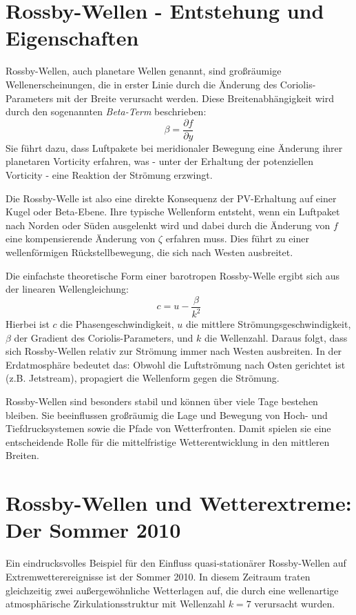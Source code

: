 \begin{refsection}
\section{Rossby-Wellen - Entstehung und Eigenschaften}

Rossby-Wellen, auch planetare Wellen genannt, sind großräumige Wellenerscheinungen, die in erster Linie durch die Änderung des Coriolis-Parameters mit der Breite verursacht werden.  
Diese Breitenabhängigkeit wird durch den sogenannten \emph{Beta-Term} beschrieben:
\[
\beta = \frac{\partial f}{\partial y}
\]
Sie führt dazu, dass Luftpakete bei meridionaler Bewegung eine Änderung ihrer planetaren Vorticity erfahren, was - unter der Erhaltung der potenziellen Vorticity - eine Reaktion der Strömung erzwingt.  

Die Rossby-Welle ist also eine direkte Konsequenz der PV-Erhaltung auf einer Kugel oder Beta-Ebene.  
Ihre typische Wellenform entsteht, wenn ein Luftpaket nach Norden oder Süden ausgelenkt wird und dabei durch die Änderung von \( f \) eine kompensierende Änderung von \( \zeta \) erfahren muss.  
Dies führt zu einer wellenförmigen Rückstellbewegung, die sich nach Westen ausbreitet.  

Die einfachste theoretische Form einer barotropen Rossby-Welle ergibt sich aus der linearen Wellengleichung:
\[
c = u - \frac{\beta}{k^2}
\]
Hierbei ist \( c \) die Phasengeschwindigkeit, \( u \) die mittlere Strömungsgeschwindigkeit, \( \beta \) der Gradient des Coriolis-Parameters, und \( k \) die Wellenzahl.  
Daraus folgt, dass sich Rossby-Wellen relativ zur Strömung immer nach Westen ausbreiten.  
In der Erdatmosphäre bedeutet das: Obwohl die Luftströmung nach Osten gerichtet ist (z.B. Jetstream), propagiert die Wellenform gegen die Strömung.  

Rossby-Wellen sind besonders stabil und können über viele Tage bestehen bleiben.  
Sie beeinflussen großräumig die Lage und Bewegung von Hoch- und Tiefdrucksystemen sowie die Pfade von Wetterfronten.  
Damit spielen sie eine entscheidende Rolle für die mittelfristige Wetterentwicklung in den mittleren Breiten.

\section{Rossby-Wellen und Wetterextreme: Der Sommer 2010}

Ein eindrucksvolles Beispiel für den Einfluss quasi-stationärer Rossby-Wellen auf Extremwetterereignisse ist der Sommer 2010.  
In diesem Zeitraum traten gleichzeitig zwei außergewöhnliche Wetterlagen auf, die durch eine wellenartige atmosphärische Zirkulationsstruktur mit Wellenzahl \( k = 7 \) verursacht wurden.  


\end{refsection}
